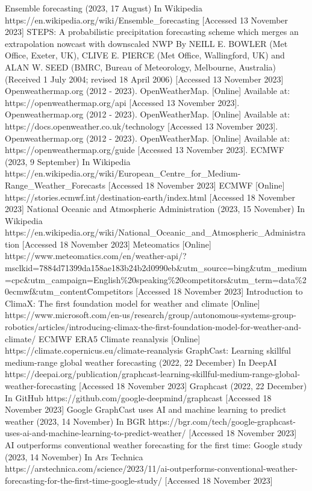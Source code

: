 \documentclass[../paper.tex]{subfiles}
\begin{document}
\begin{thebibliography}{00}
     Ensemble forecasting (2023, 17 August) In Wikipedia https://en.wikipedia.org/wiki/Ensemble\_forecasting [Accessed 13 November 2023]
     STEPS:
    A probabilistic precipitation forecasting scheme which merges an extrapolation nowcast with downscaled NWP
    By NEILL E. BOWLER (Met Office, Exeter, UK), CLIVE E. PIERCE (Met Office, Wallingford, UK) and ALAN W. SEED (BMRC,
    Bureau of Meteorology, Melbourne, Australia)
    (Received 1 July 2004; revised 18 April 2006) [Accessed 13 November 2023]
     Openweathermap.org (2012 - 2023).
    OpenWeatherMap.
    [Online] Available at: https://openweathermap.org/api [Accessed 13 November 2023].
     Openweathermap.org (2012 - 2023).
    OpenWeatherMap.
    [Online] Available at: https://docs.openweather.co.uk/technology [Accessed 13 November 2023].
     Openweathermap.org (2012 - 2023).
    OpenWeatherMap.
    [Online] Available at: https://openweathermap.org/guide [Accessed 13 November 2023].
     ECMWF (2023, 9 September) In Wikipedia https://en.wikipedia.org/wiki/European\_Centre\_for\_Medium-Range\_Weather\_Forecasts [Accessed 18 November 2023]
     ECMWF [Online] https://stories.ecmwf.int/destination-earth/index.html [Accessed 18 November 2023]
     National Oceanic and Atmospheric Administration (2023, 15 November) In Wikipedia https://en.wikipedia.org/wiki/National\_Oceanic\_and\_Atmospheric\_Administration [Accessed 18 November 2023]
     Meteomatics [Online] https://www.meteomatics.com/en/weather-api/?msclkid=7884d71399da158ae183b24b2d0990eb\&utm\_source=bing\&utm\_medium=cpc\&utm\_campaign=English\%20speaking\%20competitors\&utm\_term=data\%20ecmwf\&utm\_content\=Competitors [Accessed 18 November 2023]
     Introduction to ClimaX: The first foundation model for weather and climate [Online] https://www.microsoft.com/en-us/research/group/autonomous-systems-group-robotics/articles/introducing-climax-the-first-foundation-model-for-weather-and-climate/
     ECMWF ERA5 Climate reanalysis [Online] https://climate.copernicus.eu/climate-reanalysis
     GraphCast: Learning skillful medium-range global weather forecasting (2022, 22 December) In DeepAI https://deepai.org/publication/graphcast-learning-skillful-medium-range-global-weather-forecasting [Accessed 18 November 2023]
     Graphcast (2022, 22 December) In GitHub https://github.com/google-deepmind/graphcast [Accessed 18 November 2023]
     Google GraphCast uses AI and machine learning to predict weather (2023, 14 November) In BGR https://bgr.com/tech/google-graphcast-uses-ai-and-machine-learning-to-predict-weather/ [Accessed 18 November 2023]
     AI outperforms conventional weather forecasting for the first time: Google study (2023, 14 November) In Ars Technica https://arstechnica.com/science/2023/11/ai-outperforms-conventional-weather-forecasting-for-the-first-time-google-study/ [Accessed 18 November 2023]
\end{thebibliography}
\end{document}
